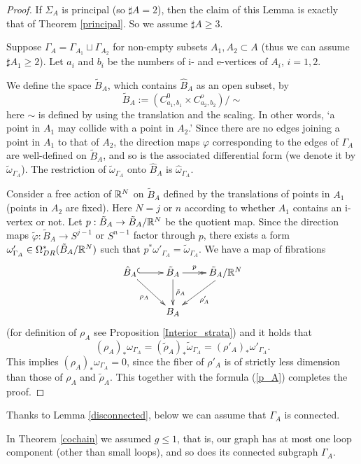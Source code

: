 \begin{proof}
If $\Sigma_A$ is principal (so $\sharp A =2$), then the claim of this Lemma is exactly that of Theorem \ref{principal}.
So we assume $\sharp A \ge 3$.

Suppose $\Gamma_A = \Gamma_{A_1} \sqcup \Gamma_{A_2}$ for non-empty subsets $A_1 ,A_2 \subset A$ (thus we can assume
$\sharp A_1 \ge 2$).
Let $a_i$ and $b_i$ be the numbers of i- and e-vertices of $A_i$, $i=1,2$.

We define the space $\tilde{B}_A$, which contains $\hat{B}_A$ as an open subset, by
\[
 \tilde{B}_A := (C^0_{a_1 ,b_1} \times C^o_{a_2 ,b_2}) / \sim
\]
here $\sim$ is defined by using the translation and the scaling.
In other words, `a point in $A_1$ may collide with a point in $A_2$.'
Since there are no edges joining a point in $A_1$ to that of $A_2$, the direction maps $\varphi$ corresponding to
the edges of $\Gamma_A$ are well-defined on $\tilde{B}_A$, and so is the associated differential form (we denote it by
$\tilde{\omega}_{\Gamma_A}$).
The restriction of $\tilde{\omega}_{\Gamma_A}$ onto $\hat{B}_A$ is $\hat{\omega}_{\Gamma_A}$.


Consider a free action of $\mathbb{R}^N$ on $\tilde{B}_A$ defined by the translations of points in $A_1$ (points in $A_2$ are
fixed).
Here $N=j$ or $n$ according to whether $A_1$ contains an i-vertex or not.
Let $p:\tilde{B}_A \to \tilde{B}_A / \mathbb{R}^N$ be the quotient map.
Since the direction maps $\tilde{\varphi}:\tilde{B}_A \to S^{j-1}$ or $S^{n-1}$ factor through $p$, there exists a
form $\omega'_{\Gamma_A} \in \Omega^*_{DR}(\tilde{B}_A /\mathbb{R}^N )$ such that
$p^* \omega'_{\Gamma_A} = \tilde{\omega}_{\Gamma_A}$.
We have a map of fibrations
\[
 \xymatrix{
 \hat{B}_A \ar@{^{(}->}[r] \ar[rd]_-{\rho_A} & \tilde{B}_A \ar[d]^-{\tilde{\rho}_A} \ar@{->>}[r]^-p
  & \tilde{B}_A / \R^N \ar[ld]^-{\rho'_A} \\
  & B_A &
 }
\]
(for definition of $\rho_A$ see Proposition \ref{Interior_strata})
and it holds that
\[
 (\rho_A )_* \omega_{\Gamma_A} =(\tilde{\rho}_A )_* \tilde{\omega}_{\Gamma_A} = (\rho'_A )_* \omega'_{\Gamma_A}.
\]
This implies $(\rho_A )_* \omega_{\Gamma_A}=0$, since the fiber of $\rho'_A$ is of strictly less dimension than those of
$\rho_A$ and $\tilde{\rho}_A$.
This together with the formula (\ref{p_A}) completes the proof.
\end{proof}


Thanks to Lemma \ref{disconnected}, below we can assume that $\Gamma_A$ is connected.


In Theorem \ref{cochain} we assumed $g \le 1$, that is, our graph has at most one loop component (other than small
loops), and so does its connected subgraph $\Gamma_A$.


